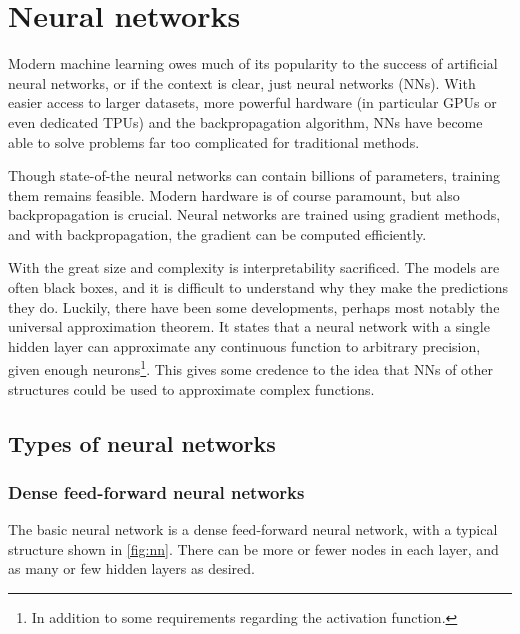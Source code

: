 \section{Neural networks}
Modern machine learning owes much of its popularity to the success of artificial neural networks, or if the context is clear, just neural networks (NNs).
With easier access to larger datasets, more powerful hardware (in particular GPUs or even dedicated TPUs) and the backpropagation algorithm, NNs have become able to solve problems far too complicated for traditional methods.

Though state-of-the neural networks can contain billions of parameters, training them remains feasible.
Modern hardware is of course paramount, but also backpropagation is crucial.
Neural networks are trained using gradient methods, and with backpropagation, the gradient can be computed efficiently.

With the great size and complexity is interpretability sacrificed.
The models are often black boxes, and it is difficult to understand why they make the predictions they do.
Luckily, there have been some developments, perhaps most notably the universal approximation theorem.
It states that a neural network with a single hidden layer can approximate any continuous function to arbitrary precision, given enough neurons\footnote{In addition to some requirements regarding the activation function.}.
This gives some credence to the idea that NNs of other structures could be used to approximate complex functions.


\subsection{Types of neural networks}
\subsubsection{Dense feed-forward neural networks}
The basic neural network is a dense feed-forward neural network, with a typical structure shown in \cref{fig:nn}.
There can be more or fewer nodes in each layer, and as many or few hidden layers as desired.

